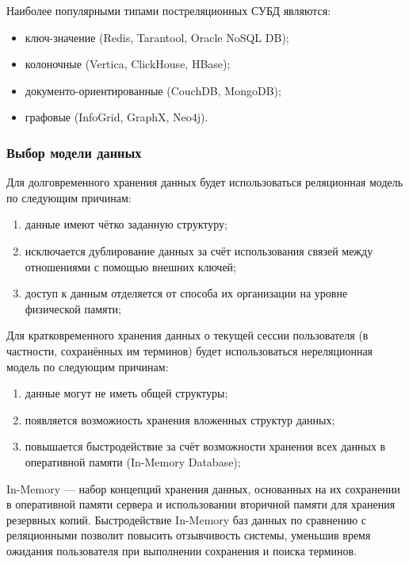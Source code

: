 \begin{enumerate}[label*=\arabic*.]
	Наиболее популярными типами постреляционных СУБД являются:
	
	\begin{itemize}[label*=---]
		\item ключ-значение (Redis, Tarantool, Oracle NoSQL DB);
		\item колоночные (Vertica, ClickHouse, HBase);
		\item документо-ориентированные (CouchDB, MongoDB);
		\item графовые (InfoGrid, GraphX, Neo4j).
	
	\end{itemize}
	
\end{enumerate}



\subsubsection{Выбор модели данных}

Для долговременного хранения данных будет использоваться реляционная модель по следующим причинам:

\begin{enumerate}[label*=\arabic*)]
	\item данные имеют чётко заданную структуру;
	\item исключается дублирование данных за счёт использования связей между отношениями с помощью внешних ключей;
	\item доступ к данным отделяется от способа их организации на уровне физической памяти;
	
\end{enumerate}

Для кратковременного хранения данных о текущей сессии пользователя (в частности, сохранённых им терминов) будет использоваться нереляционная модель по следующим причинам:

\begin{enumerate}[label*=\arabic*)]
	\item данные могут не иметь общей структуры;
	\item появляется возможность хранения вложенных структур данных;
	\item повышается быстродействие за счёт возможности хранения всех данных в оперативной памяти (In-Memory Database);
	
\end{enumerate}

In-Memory --- набор концепций хранения данных, основанных на их сохранении в оперативной памяти сервера и использовании вторичной памяти для хранения резервных копий. Быстродействие In-Memory баз данных по сравнению с реляционными позволит повысить отзывчивость системы, уменьшив время ожидания пользователя при выполнении сохранения и поиска терминов.



